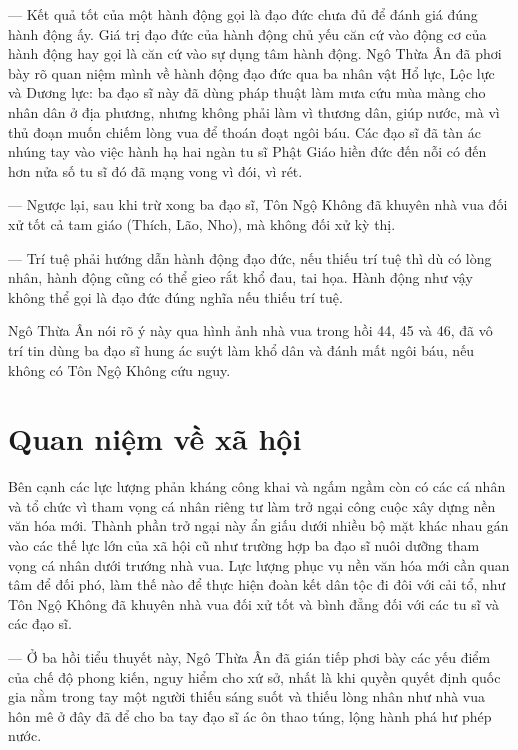 --- Kết quả tốt của một hành động gọi là đạo đức chưa đủ để đánh giá đúng hành động ấy. Giá trị đạo đức của hành động chủ yếu căn cứ vào động cơ của hành động hay gọi là căn cứ vào sự dụng tâm hành động. Ngô Thừa Ân đã phơi bày rõ quan niệm mình về hành động đạo đức qua ba nhân vật Hổ lực, Lộc lực và Dương lực: ba đạo sĩ này đã dùng pháp thuật làm mưa cứu mùa màng cho nhân dân ở địa phương, nhưng không phải làm vì thương dân, giúp nước, mà vì thủ đoạn muốn chiếm lòng vua để thoán đoạt ngôi báu. Các đạo sĩ đã tàn ác nhúng tay vào việc hành hạ hai ngàn tu sĩ Phật Giáo hiền đức đến nỗi có đến hơn nửa số tu sĩ đó đã mạng vong vì đói, vì rét.

--- Ngược lại, sau khi trừ xong ba đạo sĩ, Tôn Ngộ Không đã khuyên nhà vua đối xử tốt cả tam giáo (Thích, Lão, Nho), mà không đối xử kỳ thị.

--- Trí tuệ phải hướng dẫn hành động đạo đức, nếu thiếu trí tuệ thì dù có lòng nhân, hành động cũng có thể gieo rắt khổ đau, tai họa. Hành động như vậy không thể gọi là đạo đức đúng nghĩa nếu thiếu trí tuệ.

Ngô Thừa Ân nói rõ ý này qua hình ảnh nhà vua trong hồi 44, 45 và 46, đã vô trí tin dùng ba đạo sĩ hung ác suýt làm khổ dân và đánh mất ngôi báu, nếu không có Tôn Ngộ Không cứu nguy.


\section{Quan niệm về xã hội} %
\label{sec:44_45_xa_hoi}

Bên cạnh các lực lượng phản kháng công khai và ngấm ngầm còn có các cá nhân và tổ chức vì tham vọng cá nhân riêng tư làm trở ngại công cuộc xây dựng nền văn hóa mới. Thành phần trở ngại này ẩn giấu dưới nhiều bộ mặt khác nhau gán vào các thế lực lớn của xã hội cũ như trường hợp ba đạo sĩ nuôi dưỡng tham vọng cá nhân dưới trướng nhà vua. Lực lượng phục vụ nền văn hóa mới cần quan tâm để đối phó, làm thế nào để thực hiện đoàn kết dân tộc đi đôi với cải tổ, như Tôn Ngộ Không đã khuyên nhà vua đối xử tốt và bình đẳng đối với các tu sĩ và các đạo sĩ.

--- Ở ba hồi tiểu thuyết này, Ngô Thừa Ân đã gián tiếp phơi bày các yếu điểm của chế độ phong kiến, nguy hiểm cho xứ sở, nhất là khi quyền quyết định quốc gia nằm trong tay một người thiếu sáng suốt và thiếu lòng nhân như nhà vua hôn mê ở đây đã để cho ba tay đạo sĩ ác ôn thao túng, lộng hành phá hư phép nước.
